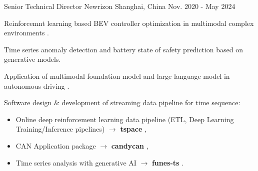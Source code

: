 \documentclass[../cv_xin.tex]{subfiles}
\begin{document}


\begin{cventries}

  \cventry
    {Senior Technical Director} %
    {Newrizon} %
    {Shanghai, China} %
    {Nov. 2020 - May 2024} %
    {
      \begin{cvitems} %
          \item Reinforcemnt learning based BEV controller optimization in multimodal complex environments
          \supercite{Xin_VEOS_22} \supercite{Xin_Fu_Pan_Simulation_Test_RL_22} \supercite{Pan_Xin_DrvStyle_23}.
          \item Time series anomaly detection and battery state of safety prediction based on generative models. \supercite{Xin_GenAI_23} \supercite{Xin_Chen_NN_TSFeatures_23}
          \item Application of multimodal foundation model and large language model in autonomous driving \supercite{Xin_LLM_24} \supercite{Xin_VLM_24} \supercite{Xin_Latent_Diffusion_23}.
          \item Software design \& development of streaming data pipeline for time sequence:
            \begin{itemize}
                    \item Online deep reinforcement learning data pipeline (ETL, Deep Learning Training/Inference pipelines) $\rightarrow$ \textbf{tspace} \href{https://binjian.github.io/tspace/}{},
                    \item CAN Application package $\rightarrow$ \textbf{candycan} \href{https://binjian.github.io/candycan/}{},
                    \item Time series analysis with generative AI $\rightarrow$ \textbf{funes-ts} \href{https://github.io/binjian/funes-ts/}{}.
            \end{itemize}
      \end{cvitems}
    }


\end{cventries}
\end{document}
